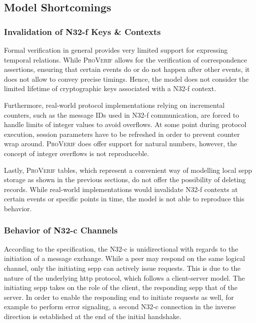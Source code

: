 \subsection{Model Shortcomings}

\subsubsection{Invalidation of N32-f Keys \& Contexts}

Formal verification in general provides very limited support for expressing temporal relations.
While \textsc{ProVerif} allows for the verification of correspondence assertions, ensuring that certain events do or do not happen after other events, it does not allow to convey precise timings.
Hence, the model does not consider the limited lifetime of cryptographic keys associated with a N32-f context.

Furthermore, real-world protocol implementations relying on incremental counters, such as the message IDs used in N32-f communication, are forced to handle limits of integer values to avoid overflows.
At some point during protocol execution, session parameters have to be refreshed in order to prevent counter wrap around.
\textsc{ProVerif} does offer support for natural numbers, however, the concept of integer overflows is not reproduceble.

Lastly, \textsc{ProVerif} tables, which represent a convenient way of modelling local \gls{sepp} storage as shown in the previous sections, do not offer the possibility of deleting records.
While real-world implementations would invalidate N32-f contexts at certain events or specific points in time, the model is not able to reproduce this behavior.

\subsubsection{Behavior of N32-c Channels}

According to the specification, the N32-c is unidirectional with regards to the initiation of a message exchange.
While a peer may respond on the same logical channel, only the initiating \gls{sepp} can actively issue requests.
This is due to the nature of the underlying \gls{http} protocol, which follows a client-server model.
The initiating \gls{sepp} takes on the role of the client, the responding \gls{sepp} that of the server.
In order to enable the responding end to initiate requests as well, for example to perform error signaling, a second N32-c connection in the inverse direction is established at the end of the initial handshake.

